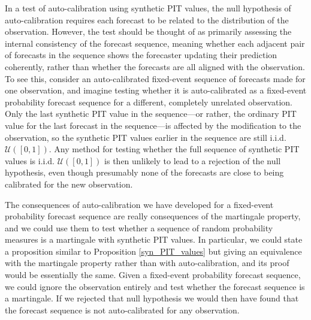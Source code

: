 \documentclass[aap]{imsart}
\theoremstyle{plain}
\theoremstyle{definition}
\begin{document}
In a test of auto-calibration using synthetic PIT values, the null hypothesis of auto-calibration requires each forecast to be related to the distribution of the observation. However, the test should be thought of as primarily assessing the internal consistency of the forecast sequence, meaning whether each adjacent pair of forecasts in the sequence shows the forecaster updating their prediction coherently, rather than whether the forecasts are all aligned with the observation. To see this, consider an auto-calibrated fixed-event sequence of forecasts made for one observation, and imagine testing whether it is auto-calibrated as a fixed-event probability forecast sequence for a different, completely unrelated observation. Only the last synthetic PIT value in the sequence---or rather, the ordinary PIT value for the last forecast in the sequence---is affected by the modification to the observation, so the synthetic PIT values earlier in the sequence are still i.i.d. $\mathcal{U}([0,1])$. Any method for testing whether the full sequence of synthetic PIT values is i.i.d. $\mathcal{U}([0,1])$ is then unlikely to lead to a rejection of the null hypothesis, even though presumably none of the forecasts are close to being calibrated for the new observation.

The consequences of auto-calibration we have developed for a fixed-event probability forecast sequence are really consequences of the martingale property, and we could use them to test whether a sequence of random probability measures is a martingale with synthetic PIT values. In particular, we could state a proposition similar to Proposition \ref{syn_PIT_values} but giving an equivalence with the martingale property rather than with auto-calibration, and its proof would be essentially the same. Given a fixed-event probability forecast sequence, we could ignore the observation entirely and test whether the forecast sequence is a martingale. If we rejected that null hypothesis we would then have found that the forecast sequence is not auto-calibrated for any observation.
\end{document}
